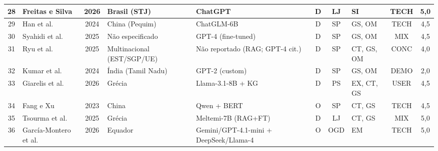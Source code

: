 \documentclass[brazilian]{sbc2025}
\begin{document}
\begin{table}[p]
\begin{tabular}{|c|>{\raggedright\arraybackslash}p{2.55cm}|c|>{\raggedright\arraybackslash}p{1.65cm}|>{\raggedright\arraybackslash}p{2.2cm}|c|c|>{\raggedright\arraybackslash}p{1.4cm}|c|c|}
28 & Freitas e Silva       & 2026 & Brasil (STJ)    & ChatGPT                    & D & LJ  & SI       & TECH & 5,0 \\ \hline
29 & Han et al.            & 2024 & China (Pequim)  & ChatGLM-6B                 & D & SP  & GS, OM   & TECH & 4,5 \\ \hline
30 & Syahidi et al.        & 2025 & Não especificado & GPT-4 (fine-tuned)        & D & SP  & GS, OM   & MIX  & 4,5 \\ \hline
31 & Ryu et al.            & 2025 & Multinacional (EST/SGP/UE) & Não reportado (RAG; GPT-4 cit.) & D & SP & CT, GS, OM & CONC & 4,0 \\ \hline
32 & Kumar et al.          & 2024 & Índia (Tamil Nadu) & GPT-2 (custom)          & D & SP  & GS, OM   & DEMO & 2,0 \\ \hline
33 & Giarelis et al.       & 2026 & Grécia          & Llama-3.1-8B + KG          & D & PS  & EX, CT, GS & USER & 4,5 \\ \hline
34 & Fang e Xu             & 2023 & China           & Qwen + BERT                & O & SP  & CT, GS   & TECH & 4,5 \\ \hline
35 & Tsourma et al.        & 2025 & Grécia          & Meltemi-7B (RAG+FT)        & D & LJ  & CT, GS   & MIX  & 5,0 \\ \hline
36 & García-Montero et al. & 2026 & Equador         & Gemini/GPT-4.1-mini + DeepSeek/Llama-4 & O & OGD & EM & TECH & 5,0 \\ \hline
\end{tabular}
\end{table}
\clearpage
\end{document}

